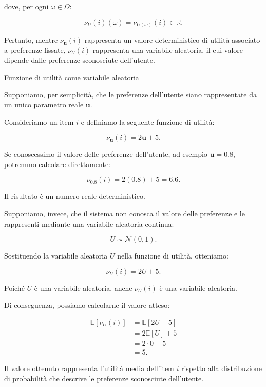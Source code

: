 dove, per ogni $\omega\in\Omega$:

\[
\nu_U(i)(\omega)=\nu_{U(\omega)}(i) \in \mathbb{R}.
\]

Pertanto, mentre $\nu_{\mathbf u}(i)$ rappresenta un valore deterministico
di utilità associato a preferenze fissate, $\nu_U(i)$ rappresenta
una variabile aleatoria, il cui valore dipende dalle preferenze
sconosciute dell'utente.

\begin{example}{Funzione di utilità come variabile aleatoria}

Supponiamo, per semplicità, che le preferenze dell'utente siano
rappresentate da un unico parametro reale $\mathbf u$.

Consideriamo un item $i$ e definiamo la seguente funzione di utilità:

\[
\nu_{\mathbf u}(i)=2\mathbf u+5.
\]

Se conoscessimo il valore delle preferenze dell'utente, ad esempio
$\mathbf u=0.8$, potremmo calcolare direttamente:

\[
\nu_{0.8}(i)=2(0.8)+5=6.6.
\]

Il risultato è un numero reale deterministico.

Supponiamo, invece, che il sistema non conosca il valore delle
preferenze e le rappresenti mediante una variabile aleatoria continua:

\[
U\sim\mathcal N(0,1).
\]

Sostituendo la variabile aleatoria $U$ nella funzione di utilità,
otteniamo:

\[
\nu_U(i)=2U+5.
\]

Poiché $U$ è una variabile aleatoria, anche $\nu_U(i)$ è una variabile
aleatoria.

Di conseguenza, possiamo calcolarne il valore atteso:

\begin{align*}
\mathbb E[\nu_U(i)]
&=\mathbb E[2U+5]\\
&=2\mathbb E[U]+5\\
&=2\cdot 0+5\\
&=5.
\end{align*}

Il valore ottenuto rappresenta l'utilità media dell'item $i$
rispetto alla distribuzione di probabilità che descrive
le preferenze sconosciute dell'utente.

\end{example}

